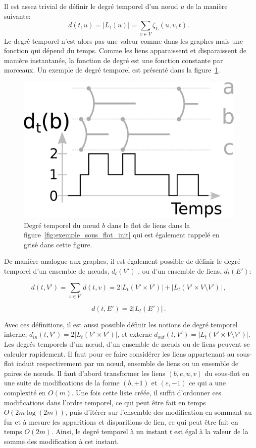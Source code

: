 Il est assez trivial de définir le degré temporel d'un n\oe{}ud $u$ de la manière suivante:
\begin{equation}
d(t,u)= |L_t(u)|= \sum_{v \in V} \zeta_{L}(u,v,t).
\end{equation}
Le degré temporel n'est alors pas une valeur comme dans les graphes mais une fonction qui dépend du temps.
Comme les liens apparaissent et disparaissent de manière instantanée, la fonction de degré est une fonction constante par morceaux.
Un exemple de degré temporel est présenté dans la figure~\ref{fig:exemple_degre}.

\begin{figure}
\centering
\includegraphics[width=0.35\linewidth]{img/Intro/degre2.eps}
\caption{Degré temporel du n\oe{}ud $b$ dans le flot de liens dans la figure~\ref{fig:exemple_sous_flot_init} qui est également rappelé en grisé dans cette figure.
}
\label{fig:exemple_degre}
\end{figure}

De manière analogue aux graphes, il est également possible de définir le degré temporel d'un ensemble de n\oe{}uds, $d_t(V')$ , ou d'un ensemble de liens, $d_t(E')$:

\begin{equation}
d(t, V') = \sum_{v \in V'} d(t,v) = 2 |L_{t}(V'\times V')|+ |L_{t}(V'\times V \setminus V')|\,,
\end{equation}

\begin{equation}
d(t, E')=2|L_{t}(E')| \,.
\end{equation}

Avec ces définitions, il est aussi possible définir les notions de degré temporel interne, $d_{in}(t,V') = 2 |L_{t}(V'\times V')|$, et externe $d_{out}(t,V')=|L_{t}(V'\times V \setminus V')|$.
Les degrés temporels d'un n\oe{}ud, d'un ensemble de n\oe{}uds ou de liens peuvent se calculer rapidement.
Il faut pour ce faire considérer les liens appartenant au sous-flot induit respectivement par un n\oe{}ud, ensemble de liens ou un ensemble de paires de n\oe{}uds.
Il faut d'abord transformer les liens $(b,e,u,v)$ du sous-flot en une suite de modifications de la forme $(b,+1)$ et $(e,-1)$ ce qui a une complexité en $O(m)$.
Une fois cette liste créée, il suffit d'ordonner ces modifications dans l'ordre temporel, ce qui peut être fait en temps $O(2m\log(2m))$, puis d'itérer sur l'ensemble des modification en sommant au fur et à mesure les apparitions et disparitions de lien, ce qui peut être fait en temps $O(2m)$.
Ainsi, le degré temporel à un instant $t$ est égal à la valeur de la somme des modification à cet instant.
\bigskip

